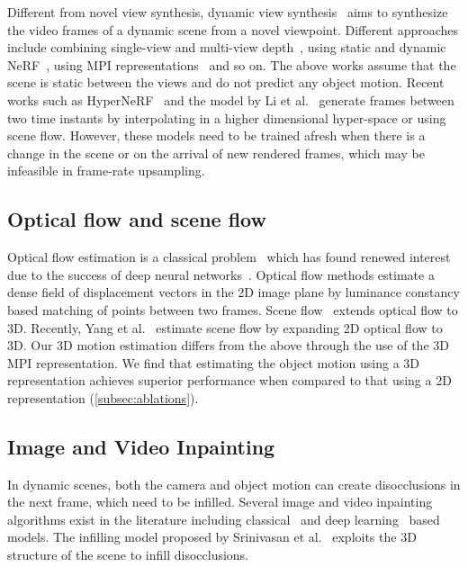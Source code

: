 \documentclass[preprint]{vgtc}
\def\etal{et al.}
\begin{document}
    Different from novel view synthesis, dynamic view synthesis~\cite{gao2021dynamic,yoon2020novel,lin2021deep} aims to synthesize the video frames of a dynamic scene from a novel viewpoint.
    Different approaches include combining single-view and multi-view depth~\cite{yoon2020novel}, using static and dynamic NeRF~\cite{gao2021dynamic}, using MPI representations~\cite{lin2021deep,xing2021temporal} and so on.
    The above works assume that the scene is static between the views and do not predict any object motion.
    Recent works such as HyperNeRF~\cite{park2021hypernerf} and the model by Li \etal~\cite{li2021neural} generate frames between two time instants by interpolating in a higher dimensional hyper-space or using scene flow.
    However, these models need to be trained afresh when there is a change in the scene or on the arrival of new rendered frames, which may be infeasible in frame-rate upsampling.

    \subsection{Optical flow and scene flow}\label{subsec: related-work-flow}
    Optical flow estimation is a classical problem~\cite{lucas1981iterative,horn1981determining} which has found renewed interest due to the success of deep neural networks~\cite{sun2018pwcnet,liu2020arflow}.
    Optical flow methods estimate a dense field of displacement vectors in the 2D image plane by luminance constancy based matching of points between two frames.
    Scene flow~\cite{vedula1999three} extends optical flow to 3D\@.
    Recently, Yang \etal~\cite{yang2020upgrading} estimate scene flow by expanding 2D optical flow to 3D.
Our 3D motion estimation differs from the above through the use of the 3D MPI representation.
    We find that estimating the object motion using a 3D representation achieves superior performance when compared to that using a 2D representation (\autoref{subsec:ablations}).

    \subsection{Image and Video Inpainting}\label{subsec:related-work-inpainting}
    In dynamic scenes, both the camera and object motion can create disocclusions in the next frame, which need to be infilled.
Several image and video inpainting algorithms exist in the literature including classical~\cite{criminisi2004region,barnes2009patchmatch,wexler2007space} and deep learning~\cite{pathak2016context,iizuka2017globally,yu2019free,nazeri2019edgeconnect,kim2019deep,xu2019deep,lee2019copy} based models.
    The infilling model proposed by Srinivasan \etal~\cite{srinivasan2019pushing} exploits the 3D structure of the scene to infill disocclusions.
\end{document}
